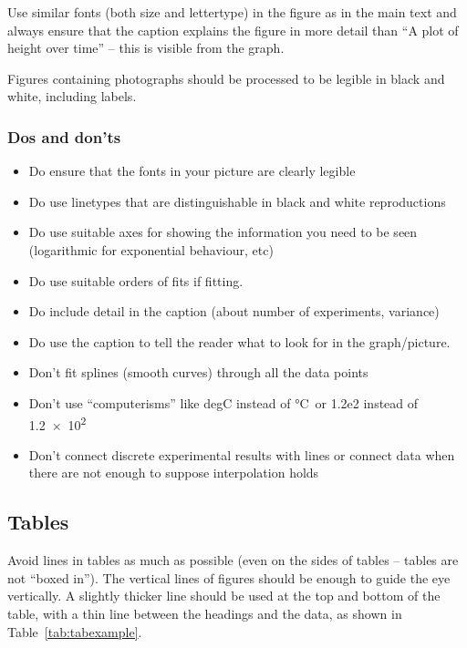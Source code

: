 \documentclass[a5paper, 10pt]{article}
\begin{document}
Use similar fonts (both size and lettertype) in the figure as in the
main text and always ensure that the caption explains the figure in
more detail than ``A plot of height over time'' -- this is visible from the
graph.

Figures containing photographs should be processed to be legible in
black and white, including labels.

\subsubsection*{Dos and don'ts}
\begin{itemize}
\item Do ensure that the fonts in your picture are clearly legible
\item Do use linetypes that are distinguishable in black and white reproductions
\item Do use suitable axes for showing the information you need to be seen (logarithmic for exponential behaviour, etc)
\item Do use suitable orders of fits if fitting.
\item Do include detail in the caption (about number of experiments, variance)
\item Do use the caption to tell the reader what to look for in the graph/picture.
\end{itemize}

\begin{itemize}
\item Don't fit splines (smooth curves) through all the data points 
\item Don't use ``computerisms'' like degC instead of \si{\celsius}\ or 1.2e2 instead of \num{1.2e2} 
\item Don't connect discrete experimental results with lines or connect data when there are not enough to suppose interpolation holds
\end{itemize}

\subsection{Tables}
Avoid lines in tables as much as possible (even on the sides
of tables -- tables are not ``boxed in'').  The vertical
lines of figures should be enough to guide the eye vertically.  A
slightly thicker line should be used at the top and bottom of the
table, with a thin line between the headings and the data, as shown in
Table~\ref{tab:tabexample}.
\end{document}
